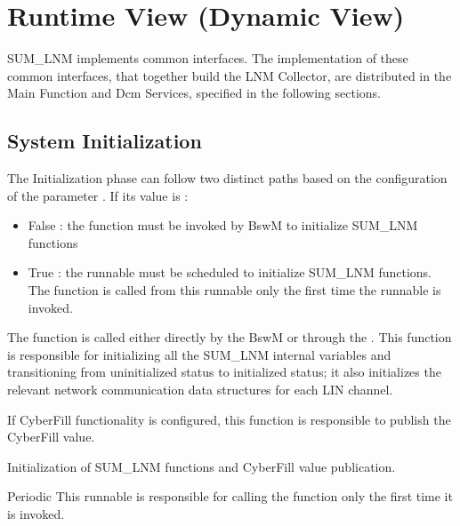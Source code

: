 \chapter{Runtime View (Dynamic View)}

{
SUM_LNM implements common interfaces. The implementation of these common interfaces, that together build the LNM Collector, are distributed in the Main Function and Dcm Services, specified in the following sections. 
}
{}

\section{System Initialization}
\label{sec:Lnm_init}
{ The Initialization phase can follow two distinct paths based on the  configuration of the parameter .   If its value is :
  
\begin{itemize}
\item False : the  function must be invoked by BswM to initialize SUM_LNM functions
\item True  : the runnable  must be scheduled to initialize SUM_LNM functions. The  function is called from this runnable only the first time the runnable is invoked.
\end{itemize}
}
{  }

{
The  function is called either directly by the BswM or through the . This function is responsible for initializing all the SUM_LNM internal variables and transitioning
from uninitialized status to initialized status; it also initializes the relevant network communication data structures for each LIN channel. 
}
{    }

{
If CyberFill functionality is configured, this function is responsible to publish the CyberFill value.
}
{}

{}
{}
{}
{}
{Initialization of SUM_LNM functions and CyberFill value publication.}

{Periodic}
{}
{}
{}
{}
{}
{This runnable is responsible for calling the  function only the first time it is invoked.
}

